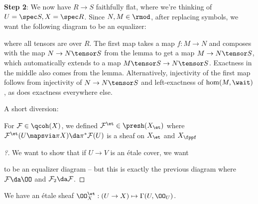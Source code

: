 \textbf{Step 2}: We now have \(R\to S\) faithfully flat, where we're
thinking of \(U = \spec S, X = \spec R\). Since \(N, M \in \rmod\),
after replacing symbols, we want the following diagram to be an
equalizer:

\begin{center}
\end{center}

where all tensors are over \(R\). The first map takes a map \(f:M\to N\)
and composes with the map \(N\to N\tensor S\) from the lemma to get a
map \(M\to N\tensor S\), which automatically extends to a map
\(M\tensor S \to N\tensor S\). Exactness in the middle also comes from
the lemma. Alternatively, injectivity of the first map follows from
injectivity of \(N\to N\tensor S\) and left-exactness of
\(\hom(M, \wait)\), as does exactness everywhere else.

A short diversion:

\begin{corollary}[of proof]

For \(\mathcal{F}\in \qcoh(X)\), we defined
\(\mathcal{F}^{\et} \in \presh(X_{\et})\) where
\(\mathcal{F}^{\et}(U\mapsvia \pi X) \da \pi^* \mathcal{F}(U)\) is a
sheaf on \(X_{\et}\) and \(X_{\fppf}\)

\end{corollary}

\begin{proof}[?]

We want to show that if \(U\to V\) is an étale cover, we want

\begin{center}
\end{center}

to be an equalizer diagram -- but this is exactly the previous diagram
where \(\mathcal{F}\da \OO\) and \(\mathcal{F}_2 \da \mathcal{F}\).

\end{proof}

\begin{example}[?]

We have an étale sheaf
\(\OO_{X}^{\et}: (U\to X) \mapsto \Gamma(U, \OO_U)\).

\end{example}

